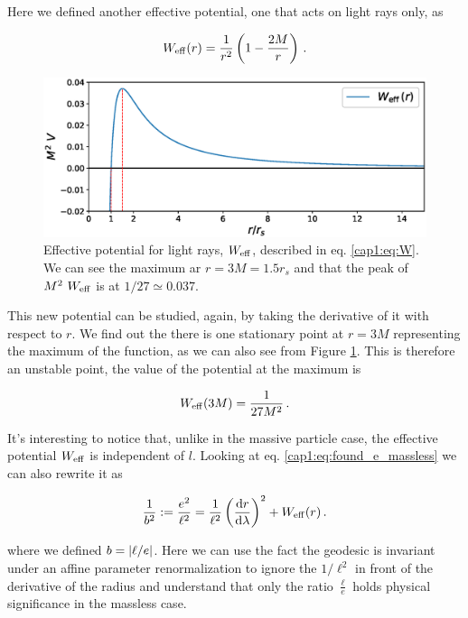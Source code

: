 Here we defined another effective potential, one that acts on light rays only,
as

\begin{equation}
    W_{\rm eff} (r) = \frac{1}{r^2} \left( 1 - \frac{2M}{r} \right) \, .
    \label{cap1:eq:W}
\end{equation}

\begin{figure}[h!]
    \centering
    \includegraphics[width = 0.85 \textwidth]{Figures/W_eff.eps}
    \caption{Effective potential for light rays, $W_{\rm eff}$, described in eq.
        \ref{cap1:eq:W}.
    We can see the maximum ar $r = 3M = 1.5 r_s$ and that the peak of
    $M^2 ~ W_{\rm eff}$ is at $1 / 27 \simeq 0.037$.}
    \label{ca1:fig:W_eff}
\end{figure}

This new potential can be studied, again, by taking the derivative of it with
respect to $r$.
We find out the there is one stationary point at $r = 3M$ representing
the maximum of the function, as we can also see from Figure \ref{ca1:fig:W_eff}.
This is therefore an unstable point, the value of the potential at the maximum
is

\begin{equation*}
    W_{\rm eff} (3 M) = \frac{1}{27 M^2} \, .
    \label{cap1:eq:max_W_eff}
\end{equation*}

It's interesting to notice that, unlike in the massive particle case, the
effective potential $W_{\rm eff}$ is independent of $l$.
Looking at eq. \ref{cap1:eq:found_e_massless} we can also rewrite it as

\begin{equation}
    \frac{1}{b^2} := \frac{e^2}{\ell^2}
    = \frac{1}{\ell^2} \left( \dv{r}{\lambda} \right)^2 + W_{\rm eff} (r) \, .
    \label{cap1:eq:found_b}
\end{equation}

where we defined $b = \abs{\ell / e}$.
Here we can use the fact the geodesic is invariant under an affine parameter
renormalization to ignore the $1 / \ell^2$ in front of the derivative of the
radius and understand that only the ratio $\frac{\ell}{e}$ holds
physical significance in the massless case.

